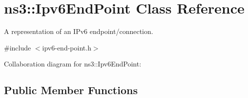 \hypertarget{classns3_1_1Ipv6EndPoint}{}\section{ns3\+:\+:Ipv6\+End\+Point Class Reference}
\label{classns3_1_1Ipv6EndPoint}


A representation of an I\+Pv6 endpoint/connection.  




{\ttfamily \#include $<$ipv6-\/end-\/point.\+h$>$}



Collaboration diagram for ns3\+:\+:Ipv6\+End\+Point\+:
\subsection*{Public Member Functions}
